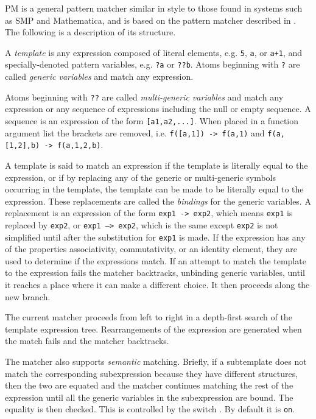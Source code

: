 PM is a general pattern matcher similar in style to those found in systems such
as SMP and Mathematica, and is based on the pattern matcher described in
\cite{McIsaac:85}.  The following is a description of its structure.

A \emph{template} is any expression composed of literal elements,
e.g. \texttt{5}, \texttt{a}, or \texttt{a+1}, and specially-denoted pattern
variables, e.g. \texttt{?a} or \texttt{??b}.  Atoms beginning with \texttt{?}
are called \emph{generic variables} and match any expression.

\hypertarget{reserved:repop}{}
\hypertarget{reserved:repdop}{}
Atoms beginning with \texttt{??} are called \emph{multi-generic variables} and
match any expression or any sequence of expressions including the null or empty
sequence.  A sequence is an expression of the form \texttt{[a1,a2,...]}.  When
placed in a function argument list the brackets are removed,
i.e. \texttt{f([a,1]) -> f(a,1)} and \texttt{f(a,[1,2],b) -> f(a,1,2,b)}.

A template is said to match an expression if the template is literally equal to
the expression, or if by replacing any of the generic or multi-generic symbols
occurring in the template, the template can be made to be literally equal to the
expression.  These replacements are called the \emph{bindings} for the generic
variables.  A replacement is an expression of the form \texttt{exp1 -> exp2},
which means \texttt{exp1} is replaced by \texttt{exp2}, or \texttt{exp1 -->
exp2}, which is the same except \texttt{exp2} is not simplified until after the
substitution for \texttt{exp1} is made.  If the expression has any of the
properties associativity, commutativity, or an identity element, they are used
to determine if the expressions match.  If an attempt to match the template to
the expression fails the matcher backtracks, unbinding generic variables, until
it reaches a place where it can make a different choice.  It then proceeds along
the new branch.

The current matcher proceeds from left to right in a depth-first search of the
template expression tree.  Rearrangements of the expression are generated when
the match fails and the matcher backtracks.

The matcher also supports \emph{semantic} matching.  Briefly, if a subtemplate
does not match the corresponding subexpression because they have different
structures, then the two are equated and the matcher continues matching the rest
of the expression until all the generic variables in the subexpression are
bound.  The equality is then checked.  This is controlled by the
switch .  By default it is \texttt{on}.

